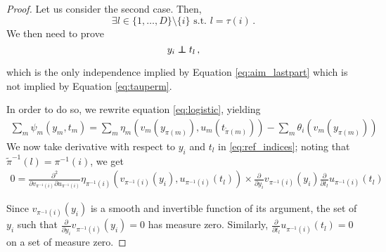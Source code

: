 \begin{proof}
	Let us consider the second case. Then,
	\[
	\exists l \in \{1, \ldots, D \}\setminus\{i\}\,\, \text{s.t.} \,\, l = \tau(i)\,.
	\]
	We then need to prove
	\begin{equation}
	y_i \independent t_l\,, \label{eq:ref_indices}
	\end{equation}
	
	which is the only independence implied by Equation \ref{eq:aim_lastpart} which is not implied by Equation \ref{eq:tauperm}.
	
	In order to do so, we rewrite equation \ref{eq:logistic}, yielding
	\begin{align}
\sum_{m}\psi_{m}(y_{m},t_{m}) \nonumber	= \sum_{m}\eta_{m}(v_m(y_{\pi(m)}), u_m(t_{\tilde{\pi}(m)}))	-\sum_{m}\theta_{i}(v_m(y_{\pi(m)}))
	\end{align}
	We now take derivative with respect to $y_i$ and $t_l$ in \ref{eq:ref_indices}; noting that $\tilde{\pi}^{-1}(l) = \pi^{-1}(i) $, we get
	\begin{align}
	0 = \frac{\partial^2}{\partial v_{\pi^{-1}(i)} \partial u_{\pi^{-1}(i)}} \eta_{\pi^{-1}(i)}(v_{\pi^{-1}(i)}(y_i), u_{\pi^{-1}(i)}(t_l)) \times \frac{\partial}{\partial y_i}v_{\pi^{-1}(i)}(y_i) \frac{\partial }{\partial t_l} u_{\pi^{-1}(i)}(t_l) \label{eq:perm_deriv}
	\end{align}
	
	Since $v_{\pi^{-1}(i)}(y_i)$ is a smooth and invertible function of its argument, the set of $y_i$ such that $\frac{\partial}{\partial y_i}v_{\pi^{-1}(i)}(y_i) = 0$ has measure zero.
	Similarly, $\frac{\partial }{\partial t_l} u_{\pi^{-1}(i)}(t_l) = 0$ on a set of measure zero.
	

\end{proof}

